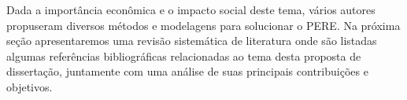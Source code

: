 Dada a import\^ancia econ\^omica e o impacto social deste tema, v\'arios autores propuseram diversos m\'etodos e modelagens para solucionar o \ac{PERE}. Na pr\'oxima seç\~ao apresentaremos uma revis\~ao sistem\'atica de literatura onde s\~ao listadas algumas refer\^encias bibliogr\'aficas relacionadas ao tema desta proposta de dissertaç\~ao, juntamente com uma an\'alise de suas principais contribuiç\~oes e objetivos.






